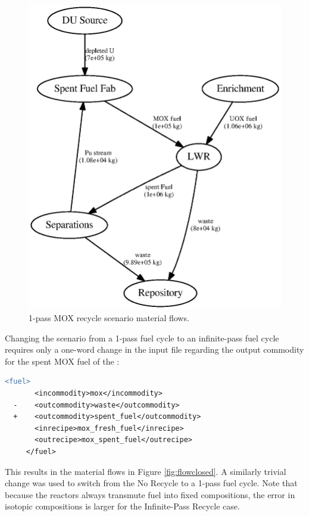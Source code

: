 \begin{figure}[H]
\begin{center}
\includegraphics[width=\textwidth]{./images/flow-mod-open-1.eps}
\end{center}
\caption{1-pass \gls{MOX} recycle scenario material flows.}
\label{fig:flowmodopen}
\end{figure}

Changing the scenario from a 1-pass fuel cycle to an infinite-pass fuel cycle
requires only a one-word change in the input file regarding the output
commodity for the spent \gls{MOX} fuel of the :

\begin{lstlisting}[language=diff]
     <fuel>
       <incommodity>mox</incommodity>
  -    <outcommodity>waste</outcommodity>
  +    <outcommodity>spent_fuel</outcommodity>
       <inrecipe>mox_fresh_fuel</inrecipe>
       <outrecipe>mox_spent_fuel</outrecipe>
     </fuel>
\end{lstlisting}

This results in the material flows in Figure \ref{fig:flowclosed}.  A
similarly trivial change was used to switch from the No Recycle to a 1-pass
fuel cycle.  Note that because the reactors always transmute fuel into fixed
compositions, the error in isotopic compositions is larger for the
Infinite-Pass Recycle case.

